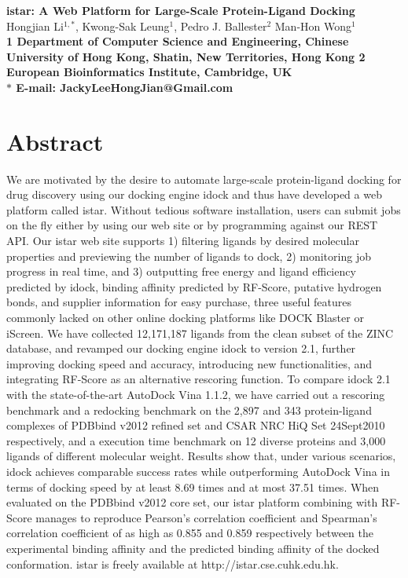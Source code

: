 \documentclass[10pt]{article}
\date{}
\begin{document}
\begin{flushleft}
{\Large
\textbf{istar: A Web Platform for Large-Scale Protein-Ligand Docking}
}
\\
Hongjian Li$^{1,\ast}$, 
Kwong-Sak Leung$^{1}$, 
Pedro J. Ballester$^{2}$
Man-Hon Wong$^{1}$
\\
\bf{1} Department of Computer Science and Engineering, Chinese University of Hong Kong, Shatin, New Territories, Hong Kong
\bf{2} European Bioinformatics Institute, Cambridge, UK
\\
$\ast$ E-mail: JackyLeeHongJian@Gmail.com
\end{flushleft}

\section*{Abstract}
We are motivated by the desire to automate large-scale protein-ligand docking for drug discovery using our docking engine idock and thus have developed a web platform called istar. Without tedious software installation, users can submit jobs on the fly either by using our web site or by programming against our REST API. Our istar web site supports 1) filtering ligands by desired molecular properties and previewing the number of ligands to dock, 2) monitoring job progress in real time, and 3) outputting free energy and ligand efficiency predicted by idock, binding affinity predicted by RF-Score, putative hydrogen bonds, and supplier information for easy purchase, three useful features commonly lacked on other online docking platforms like DOCK Blaster or iScreen. We have collected 12,171,187 ligands from the clean subset of the ZINC database, and revamped our docking engine idock to version 2.1, further improving docking speed and accuracy, introducing new functionalities, and integrating RF-Score as an alternative rescoring function. To compare idock 2.1 with the state-of-the-art AutoDock Vina 1.1.2, we have carried out a rescoring benchmark and a redocking benchmark on the 2,897 and 343 protein-ligand complexes of PDBbind v2012 refined set and CSAR NRC HiQ Set 24Sept2010 respectively, and a execution time benchmark on 12 diverse proteins and 3,000 ligands of different molecular weight. Results show that, under various scenarios, idock achieves comparable success rates while outperforming AutoDock Vina in terms of docking speed by at least 8.69 times and at most 37.51 times. When evaluated on the PDBbind v2012 core set, our istar platform combining with RF-Score manages to reproduce Pearson's correlation coefficient and Spearman's correlation coefficient of as high as 0.855 and 0.859 respectively between the experimental binding affinity and the predicted binding affinity of the docked conformation. istar is freely available at http://istar.cse.cuhk.edu.hk.
\end{document}
